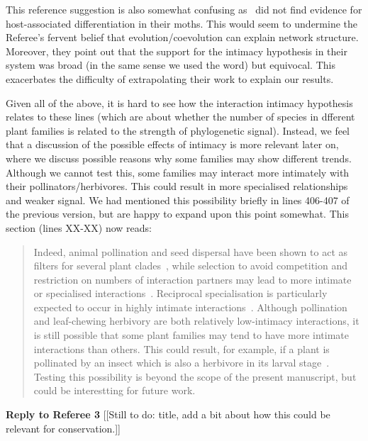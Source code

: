\documentclass[12pt]{letter}
\begin{document}
		This reference suggestion is also somewhat confusing as~\citet{Hembry2018} did not find evidence for host-associated differentiation in their moths. This would seem to undermine the Referee's fervent belief that evolution/coevolution can explain network structure. Moreover, they point out that the support for the intimacy hypothesis  in their system was broad (in the same sense we used the word) but equivocal. This exacerbates the difficulty of extrapolating their work to explain our results.


		Given all of the above, it is hard to see how the interaction intimacy hypothesis relates to these lines (which are about whether the number of species in dfferent plant families is related to the strength of phylogenetic signal). Instead, we feel that a discussion of the possible effects of intimacy is more relevant later on, where we discuss possible reasons why some families may show different trends. Although we cannot test this, some families may interact more intimately with their pollinators/herbivores. This could result in more specialised relationships and weaker signal. We had mentioned this possibility briefly in lines 406-407 of the previous version, but are happy to expand upon this point somewhat. This section (lines XX-XX) now reads:


		\begin{quotation}

			Indeed, animal pollination and seed dispersal have been shown to act
		  	as filters for several plant clades~\citep{Mayfield2009}, while selection to avoid 
		  competition and restriction on numbers of interaction partners may lead to
		  more intimate or specialised interactions~\citep{Ponisio2017}. 
		  Reciprocal specialisation is particularly expected to occur in highly intimate interactions~\citep{Hembry2018}. Although pollination and leaf-chewing herbivory are both relatively low-intimacy interactions, it is still possible that some plant families may tend to have more intimate interactions than others. This could result, for example, if a plant is pollinated by an insect which is also a herbivore in its larval stage~\citep{Hembry2018}. Testing this possibility is beyond the scope of the present manuscript, but could be interestting for future work. 

		\end{quotation}


\clearpage

{\Large \bf Reply to Referee 3} [[Still to do: title, add a bit about how this could be relevant for conservation.]]
\end{document}

